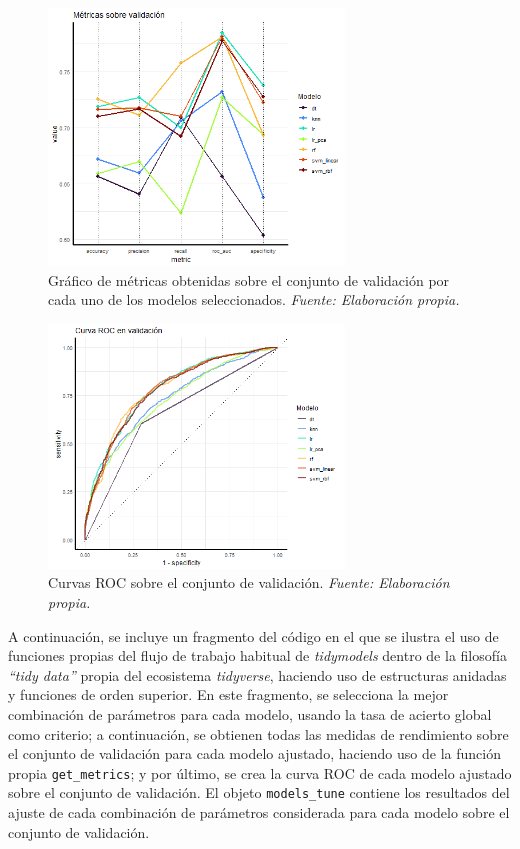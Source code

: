 \documentclass[12pt,a4paper,]{book}
\numberwithin{dummy}{section}
\theoremstyle{ocrenumbox}
\theoremstyle{blacknumex}
\theoremstyle{blacknumbox}
\theoremstyle{ocrenum}
\theoremstyle{ocrenum}
\begin{document}
\begin{figure}[H]
\centering
\includegraphics[width =0.7\textwidth]{graficos/validation_metrics.png}
\caption[Gráfico de métricas obtenidas sobre el conjunto de validación]{Gráfico de métricas obtenidas sobre el conjunto de validación por cada uno de los modelos seleccionados. \it Fuente: Elaboración propia.}
\label{fig:validation_metrics}
\end{figure}

\begin{figure}[H]
\centering
\includegraphics[width =0.7\textwidth]{graficos/roc_validation.png}
\caption[Curvas ROC sobre el conjunto de validación]{Curvas ROC sobre el conjunto de validación. \it Fuente: Elaboración propia.}
\label{fig:roc_validation}
\end{figure}

A continuación, se incluye un fragmento del código en el que se ilustra
el uso de funciones propias del flujo de trabajo habitual de
\emph{tidymodels} dentro de la filosofía \emph{``tidy data''} propia del
ecosistema \emph{tidyverse}, haciendo uso de estructuras anidadas y
funciones de orden superior. En este fragmento, se selecciona la mejor
combinación de parámetros para cada modelo, usando la tasa de acierto
global como criterio; a continuación, se obtienen todas las medidas de
rendimiento sobre el conjunto de validación para cada modelo ajustado,
haciendo uso de la función propia \texttt{get\_metrics}; y por último,
se crea la curva ROC de cada modelo ajustado sobre el conjunto de
validación. El objeto \texttt{models\_tune} contiene los resultados del
ajuste de cada combinación de parámetros considerada para cada modelo
sobre el conjunto de validación.
\end{document}
